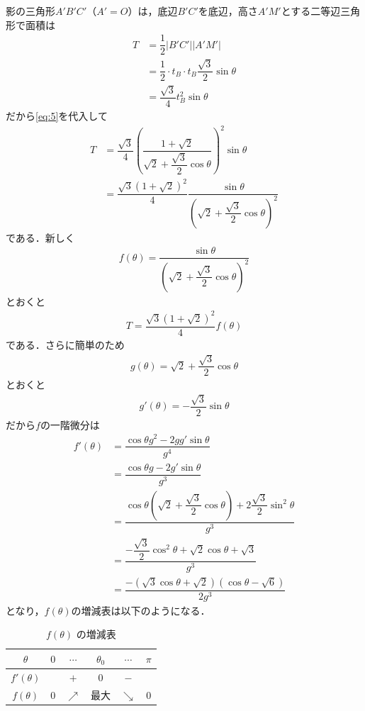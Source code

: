 \documentclass[../../main.tex]{subfiles}
\begin{document}
影の三角形$A'B'C'$（$A'=O$）は，底辺$B'C'$を底辺，高さ$A'M'$とする二等辺三角形で面積は
\begin{align}
  T
  &=\dfrac{1}{2}|B'C'||A'M'| \\
  &=\dfrac{1}{2} \cdot t_B \cdot t_B\dfrac{\sqrt{3}}{2}\sin\theta \\
  &=\dfrac{\sqrt{3}}{4}t_B^2\sin\theta
\end{align}
だから\cref{eq:5}を代入して
\begin{align}
  T
  &= \dfrac{\sqrt{3}}{4} \left(\dfrac{1+\sqrt{2}}{\sqrt{2}+\dfrac{\sqrt{3}}{2}\cos\theta}\right)^2\sin\theta \\
  &= \dfrac{\sqrt{3}\left(1+\sqrt{2}\right)^2}{4} \dfrac{\sin\theta}{\left(\sqrt{2}+\dfrac{\sqrt{3}}{2}\cos\theta\right)^2} \label{eq:7}
\end{align}
である．新しく
\begin{align}
  f(\theta) = \dfrac{\sin\theta}{\left(\sqrt{2}+\dfrac{\sqrt{3}}{2}\cos\theta\right)^2} \label{eq:8}
\end{align}
とおくと
\begin{align}
  T = \dfrac{\sqrt{3}\left(1+\sqrt{2}\right)^2}{4} f(\theta) \label{eq:9}
\end{align}
である．さらに簡単のため
\begin{align}
  g(\theta) = \sqrt{2}+\dfrac{\sqrt{3}}{2}\cos\theta \label{eq:10}
\end{align}
とおくと
\begin{align}
  g'(\theta) = - \dfrac{\sqrt{3}}{2}\sin\theta
\end{align}
だから$f$の一階微分は
\begin{align}
  f'(\theta)
  &= \dfrac{\cos\theta g^2 - 2gg'\sin\theta}{g^4} \\
  &= \dfrac{\cos\theta g - 2g'\sin\theta}{g^3} \\
  &= \dfrac{\cos\theta\left(\sqrt{2}+\dfrac{\sqrt{3}}{2}\cos\theta\right) + 2\dfrac{\sqrt{3}}{2}\sin^2\theta}{g^3} \\
  &= \dfrac{-\dfrac{\sqrt{3}}{2}\cos^2\theta + \sqrt{2}\cos\theta+\sqrt{3}}{g^3} \\
  &= \dfrac{-\left(\sqrt{3}\cos\theta+\sqrt{2}\right)\left(\cos\theta-\sqrt{6}\right)}{2g^3}
\end{align}
となり，$f(\theta)$の増減表は以下のようになる．

\begin{table}[htb]
  \centering
  \caption{$f(\theta)$ の増減表}
  \label{tab:variation}
  \begin{tabular}{c|ccccc}
    $\theta$ & $0$ & $\cdots$ & $\theta_0$ & $\cdots$ & $\pi$ \\ \hline
    $f'(\theta)$ & & $+$ & $0$ & $-$ & \\ \hline
    $f(\theta)$ & $0$ & $\nearrow$ & 最大 & $\searrow$ & $0$
  \end{tabular}
\end{table}
\end{document}

